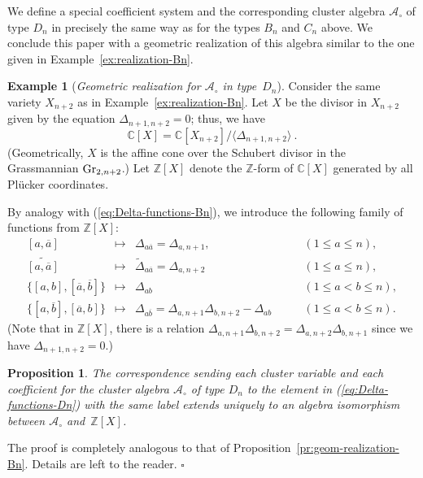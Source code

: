 \documentclass[letterpaper]{amsart}
\numberwithin{equation}{section}
\newtheorem{proposition}[theorem]{Proposition}
\theoremstyle{definition}
\newtheorem{example}[theorem]{Example}
\def\proof{\smallskip\noindent {\bf Proof.\ }}
\def\endproof{\hfill$\square$\medskip}
\def\AA{\mathcal{A}}
\def\ZZ{\mathbb{Z}}
\def\CC{\mathbb{C}}
\begin{document}
We define a special coefficient system and the corresponding 
cluster algebra $\AA_\circ$ of type $D_n$ in 
precisely the same way as for the types $B_n$ and $C_n$ above. 
We conclude this paper with a geometric realization of this 
algebra similar to the one given in 
Example~\ref{ex:realization-Bn}. 
 
\begin{example} 
[\emph{Geometric realization for $\AA_\circ$ in type~$D_n$}] 
\label{ex:realization-Dn} 
Consider the same variety $X_{n+2}$ as in 
Example~\ref{ex:realization-Bn}. 
Let $X$ be the divisor in $X_{n+2}$ given by the equation 
$\Delta_{n+1,n+2}= 0$; thus, we have 
$$\CC[X] = \CC[X_{n+2}]/\langle \Delta_{n+1,n+2} \rangle \ .$$ 
(Geometrically, $X$ is the affine cone over 
the Schubert divisor in the Grassmannian ${\rm Gr}_{2,n+2}$.) 
Let $\ZZ[X]$ denote the $\ZZ$-form of $\CC[X]$ generated by all Pl\"ucker 
coordinates. 
 
By analogy with (\ref{eq:Delta-functions-Bn}), we introduce 
the following family of functions from $\ZZ[X]$: 
\begin{equation} 
\label{eq:Delta-functions-Dn} 
\begin{array}{rcll} 
[a, \overline a]  &\mapsto& \Delta_{a \overline a} = \Delta_{a,n+1}, 
&\qquad (1 \leq a \leq n),\\[.05in] 
\widetilde{[a, \overline a]}  &\mapsto& 
\tilde \Delta_{a \overline a} = \Delta_{a,n+2} 
&\qquad (1 \leq a \leq n),\\[.05in] 
\{[a,b], [\overline a, \overline b]\} &\mapsto& \Delta_{ab} 
 &\qquad (1 \leq a < b \leq n),\\[.05in] 
\{[a,\overline b], [\overline a, b]\} &\mapsto& 
\Delta_{a \overline b} = 
\Delta_{a,n+1} \Delta_{b,n+2} - \Delta_{ab} 
&\qquad 
(1 \leq a < b \leq n). 
\end{array} 
\end{equation} 
(Note that in $\ZZ[X]$, there is a relation 
$\Delta_{a,n+1} \Delta_{b,n+2} = \Delta_{a,n+2} \Delta_{b,n+1}$ 
since we have $\Delta_{n+1,n+2} = 0$.) 
 
 
\begin{proposition} 
\label{pr:geom-realization-Dn} 
The correspondence sending each cluster variable 
and each coefficient for the cluster algebra $\AA_\circ$ 
of type $D_n$ to the element in {\rm (\ref{eq:Delta-functions-Dn})} 
with the same label extends uniquely to an algebra isomorphism between 
$\AA_\circ$ and~$\ZZ[X]$. 
\end{proposition} 
 
\proof 
The proof is completely analogous 
to that of Proposition~\ref{pr:geom-realization-Bn}. 
Details are left to the reader. 
\endproof 
 
\end{example} 
 
\end{document}
